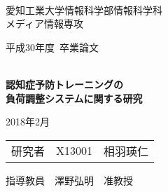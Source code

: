 \begin{titlepage}

\ \\
\begin{center}

{\LARGE 愛知工業大学情報科学部情報科学科\\
メディア情報専攻

\vspace{1.0cm}

平成30年度~卒業論文\\

\vspace{2.0cm}

{\Huge 
\baselineskip=15mm
\textbf{\\認知症予防トレーニングの\\負荷調整システムに関する研究\\}}

\vspace{5.0cm}

2018年2月\\

\vspace{1.0cm}

\begin{tabular}[h]{lll}
  研究者 & X13001 & 相羽瑛仁\\
\end{tabular}

\vspace{1.0cm}

指導教員\ \ 澤野弘明\ \ 准教授}

\end{center}

\end{titlepage}
